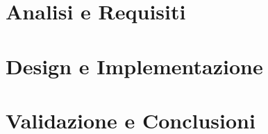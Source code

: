 \documentclass[12pt,a4paper,openright,twoside]{book}
\begin{document}
\chapter{Analisi e Requisiti}
\label{chap:requisiti}


\chapter{Design e Implementazione}
\label{chap:Imple}


\chapter{Validazione e Conclusioni}
\label{chap:conclusioni}



\backmatter




\end{document}
